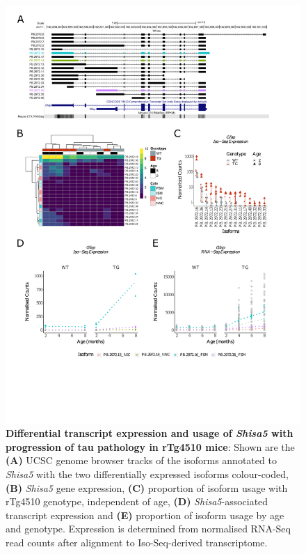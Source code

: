 \begin{figure}[!htp]
	\centering
	\includegraphics[page=5,trim={1.5cm 1.5cm 2cm 1cm}, scale = 0.80]{Figures/Ch5_DiffPlots.pdf}
	\captionsetup{width=0.95\textwidth}
	\caption[Differential \textit{Shisa5} transcript expression and usage]%
	{\textbf{Differential transcript expression and usage of \textit{Shisa5} with progression of tau pathology in rTg4510 mice}: Shown are the \textbf{(A)} UCSC genome browser tracks of the isoforms annotated to \textit{Shisa5} with the two differentially expressed isoforms colour-coded, \textbf{(B)} \textit{Shisa5} gene expression, \textbf{(C)} proportion of isoform usage with rTg4510 genotype, independent of age, \textbf{(D)} \textit{Shisa5}-associated transcript expression and \textbf{(E)} proportion of isoform usage by age and genotype. Expression is determined from normalised RNA-Seq read counts after alignment to Iso-Seq-derived transcriptome.} 
	\label{fig:DIU_shisa5}
\end{figure}

